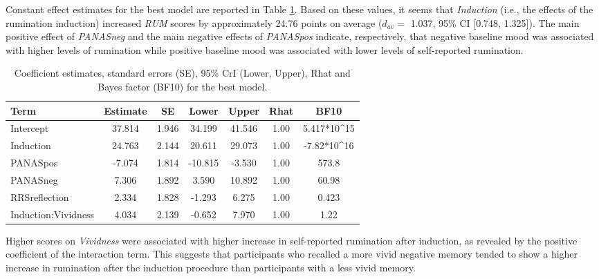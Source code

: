 \documentclass[a4paper,12pt,twoside,onecolumn,openright,final,oldfontcommands]{memoir}
\begin{document}
Constant effect estimates for the best model are reported in Table \ref{tab:paramexp1}. Based on these values, it seems that \emph{Induction} (i.e., the effects of the rumination induction) increased \emph{RUM} scores by approximately 24.76 points on average (\(d_{av} =\) 1.037, 95\% CI {[}0.748, 1.325{]}). The main positive effect of \emph{PANASneg} and the main negative effects of \emph{PANASpos} indicate, respectively, that negative baseline mood was associated with higher levels of rumination while positive baseline mood was associated with lower levels of self-reported rumination.

\begin{table}[H]
\begin{center}
\begin{threeparttable}
\caption{\label{tab:paramexp1}Coefficient estimates, standard errors (SE), 95\% CrI (Lower, Upper), Rhat and Bayes factor (BF10) for the best model.}
\small{
\begin{tabular}{lcccccc}
\toprule
Term & \multicolumn{1}{c}{Estimate} & \multicolumn{1}{c}{SE} & \multicolumn{1}{c}{Lower} & \multicolumn{1}{c}{Upper} & \multicolumn{1}{c}{Rhat} & \multicolumn{1}{c}{BF10}\\
\midrule
Intercept & 37.814 & 1.946 & 34.199 & 41.546 & 1.00 & 5.417*10\textasciicircum{}15\\
Induction & 24.763 & 2.144 & 20.611 & 29.073 & 1.00 & -7.82*10\textasciicircum{}16\\
PANASpos & -7.074 & 1.814 & -10.815 & -3.530 & 1.00 & 573.8\\
PANASneg & 7.306 & 1.892 & 3.590 & 10.892 & 1.00 & 60.98\\
RRSreflection & 2.334 & 1.828 & -1.293 & 6.275 & 1.00 & 0.423\\
Induction:Vividness & 4.034 & 2.139 & -0.652 & 7.970 & 1.00 & 1.22\\
\bottomrule
\end{tabular}
}
\end{threeparttable}
\end{center}
\end{table}

Higher scores on \emph{Vividness} were associated with higher increase in self-reported rumination after induction, as revealed by the positive coefficient of the interaction term. This suggests that participants who recalled a more vivid negative memory tended to show a higher increase in rumination after the induction procedure than participants with a less vivid memory.
\end{document}
